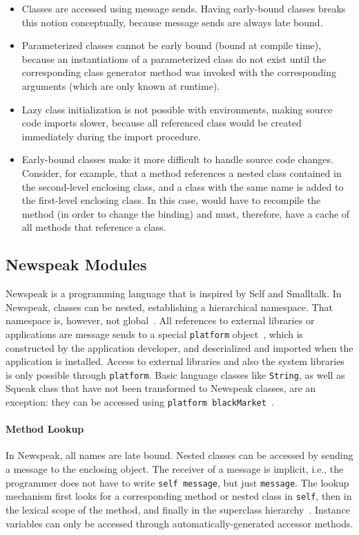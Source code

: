 \begin{itemize}
    \item Classes are accessed using message sends. Having early-bound classes breaks this notion conceptually, because message sends are always late bound.
    \item Parameterized classes cannot be early bound (bound at compile time), because an instantiations of a parameterized class do not exist until the corresponding class generator method was invoked with the corresponding arguments (which are only known at runtime).
    \item Lazy class initialization is not possible with environments, making source code imports slower, because all referenced class would be created immediately during the import procedure.
    \item Early-bound classes make it more difficult to handle source code changes. Consider, for example, that a method references a nested class contained in the second-level enclosing class, and a class with the same name is added to the first-level enclosing class. In this case, \msname would have to recompile the method (in order to change the binding) and must, therefore, have a cache of all methods that reference a class.
\end{itemize}

\subsection{Newspeak Modules}
Newspeak is a programming language that is inspired by Self and Smalltalk. In Newspeak, classes can be nested, establishing a hierarchical namespace. That namespace is, however, not global~\cite{bracha2008newspeak, Bracha:2011:MDR:1960275.1960310}. All references to external libraries or applications are message sends to a special \texttt{platform} object~\cite{bracha:modules_as_objects}, which is constructed by the application developer, and deserialized and imported when the application is installed. Access to external libraries and also the system libraries is only possible through \texttt{platform}. Basic language classes like \texttt{String}, as well as Squeak class that have not been transformed to Newspeak classes, are an exception: they can be accessed using \texttt{platform blackMarket}~\cite{newspeak101jan}.

\paragraph{Method Lookup}
In Newspeak, all names are late bound. Nested classes can be accessed by sending a message to the enclosing object. The receiver of a message is implicit, i.e., the programmer does not have to write \texttt{self message}, but just \texttt{message}. The lookup mechanism first looks for a corresponding method or nested class in \texttt{self}, then in the lexical scope of the method, and finally in the superclass hierarchy~\cite{bracha:modules_as_objects}. Instance variables can only be accessed through automatically-generated accessor methods.

